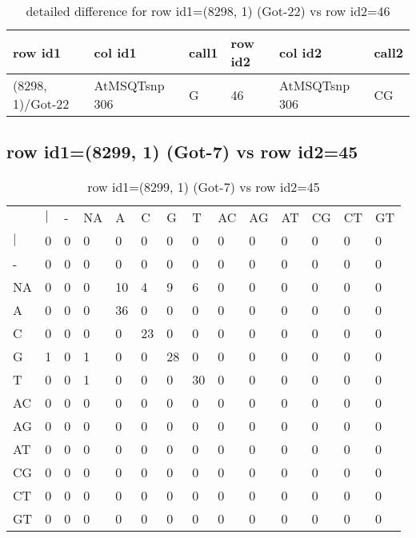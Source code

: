 \begin{center}
\begin{longtable}{|l|l|l|l|l|l|}
\caption{detailed difference for row id1=(8298, 1) (Got-22) vs row id2=46} \label{table_dm281}\\
\hline
row id1&col id1&call1&row id2&col id2&call2\\
\hline
(8298, 1)/Got-22&AtMSQTsnp 306&G&46&AtMSQTsnp 306&CG\\
\hline
\end{longtable}
\end{center}

\subsection{row id1=(8299, 1) (Got-7) vs row id2=45}
\begin{center}
\begin{longtable}{|l|l|l|l|l|l|l|l|l|l|l|l|l|l|}
\caption{row id1=(8299, 1) (Got-7) vs row id2=45} \label{table_dm282}\\
\hline
\\
\hline
&$|$&-&NA&A&C&G&T&AC&AG&AT&CG&CT&GT\\
$|$&0&0&0&0&0&0&0&0&0&0&0&0&0\\
-&0&0&0&0&0&0&0&0&0&0&0&0&0\\
NA&0&0&0&10&4&9&6&0&0&0&0&0&0\\
A&0&0&0&36&0&0&0&0&0&0&0&0&0\\
C&0&0&0&0&23&0&0&0&0&0&0&0&0\\
G&1&0&1&0&0&28&0&0&0&0&0&0&0\\
T&0&0&1&0&0&0&30&0&0&0&0&0&0\\
AC&0&0&0&0&0&0&0&0&0&0&0&0&0\\
AG&0&0&0&0&0&0&0&0&0&0&0&0&0\\
AT&0&0&0&0&0&0&0&0&0&0&0&0&0\\
CG&0&0&0&0&0&0&0&0&0&0&0&0&0\\
CT&0&0&0&0&0&0&0&0&0&0&0&0&0\\
GT&0&0&0&0&0&0&0&0&0&0&0&0&0\\
\hline
\end{longtable}
\end{center}

